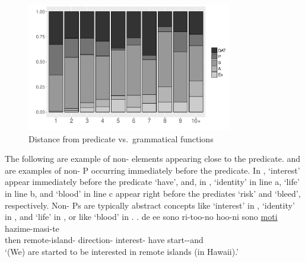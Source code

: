 \begin{figure}
	\begin{center}
	\includegraphics[width=0.8\textwidth]{figure/DiffASP.pdf}
	\caption{Distance from predicate vs.~grammatical functions}
	\label{WO:Prep:New:DiffASPF}
	\end{center}
\end{figure}


The following are example of non- elements appearing close to the predicate.
\Next and \NNext are examples of non- P occurring immediately before the predicate.
In \Next,
 `interest' appear immediately before the predicate  `have',
and, in \NNext,
 `identity' in line a,  `life' in line b, and  `blood' in line c appear right before the prediates  `risk' and  `bleed', respectively.
Non- Ps are typically abstract concepts like  `interest' in \Next,  `identity' in \NNext[a], and  `life' in \NNext[b], or
 like  `blood' in \NNext[c].
%
\exg. de ee sono ri-too-no hoo-ni sono  \ul{moti} hazime-masi-te \\
		then \ab{fl}  remote-island- direction-  interest- have start--and \\
	`(We) are started to be interested in remote islands (in Hawaii).'

